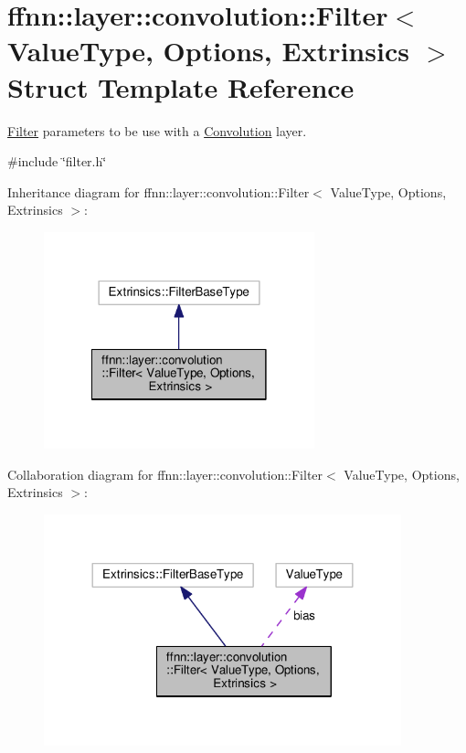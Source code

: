 \hypertarget{structffnn_1_1layer_1_1convolution_1_1_filter}{\section{ffnn\-:\-:layer\-:\-:convolution\-:\-:Filter$<$ Value\-Type, Options, Extrinsics $>$ Struct Template Reference}
\label{structffnn_1_1layer_1_1convolution_1_1_filter}
}


\hyperlink{structffnn_1_1layer_1_1convolution_1_1_filter}{Filter} parameters to be use with a \hyperlink{classffnn_1_1layer_1_1_convolution}{Convolution} layer.  




{\ttfamily \#include \char`\"{}filter.\-h\char`\"{}}



Inheritance diagram for ffnn\-:\-:layer\-:\-:convolution\-:\-:Filter$<$ Value\-Type, Options, Extrinsics $>$\-:\nopagebreak
\begin{figure}[H]
\begin{center}
\leavevmode
\includegraphics[width=222pt]{structffnn_1_1layer_1_1convolution_1_1_filter__inherit__graph}
\end{center}
\end{figure}


Collaboration diagram for ffnn\-:\-:layer\-:\-:convolution\-:\-:Filter$<$ Value\-Type, Options, Extrinsics $>$\-:\nopagebreak
\begin{figure}[H]
\begin{center}
\leavevmode
\includegraphics[width=293pt]{structffnn_1_1layer_1_1convolution_1_1_filter__coll__graph}
\end{center}
\end{figure}
